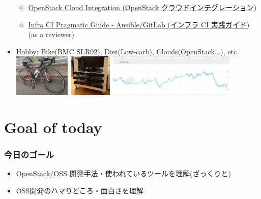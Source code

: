 \documentclass[aspectratio=169,11pt,hyperref={colorlinks=true}]{beamer}
\begin{document}
\begin{frame}
\begin{itemize}
      \begin{itemize}
      \item \href{https://www.amazon.co.jp/dp/4798139785/}{\scriptsize{OpenStack
        Cloud Integration (OpenStack クラウドインテグレーション)}}
      \item \href{https://www.amazon.co.jp/dp/4798155128/}{\scriptsize{Infra CI
        Pragmatic Guide - Ansible/GitLab (インフラ CI 実践ガイド)}} (as a reviewer)
      \end{itemize}
    \item Hobby: Bike(BMC SLR02), Diet(Low-carb), Clouds(OpenStack...), etc.
    \includegraphics[height=20mm]{images/my-bike.jpg}~\includegraphics[height=20mm]{images/server_front.jpg}~\includegraphics[height=20mm]{images/my-weight.png}
  \end{itemize}
\end{frame}

\section{Goal of today}
\begin{frame}
  \frametitle{今日のゴール}
  \begin{itemize}
    \item OpenStack/OSS 開発手法・使われているツールを理解(ざっくりと)
    \item OSS開発のハマりどころ・面白さを理解
  \end{itemize}
\end{frame}
\end{document}
